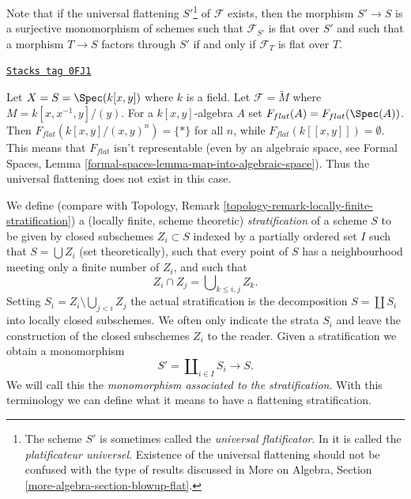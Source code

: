 Note that if the universal flattening $S'$\footnote{The scheme $S'$ is sometimes
called the {\it universal flatificator}. In \cite{GruRay} it is called
the {\it platificateur universel}. Existence of the universal flattening
should not be confused with the type of results discussed in
More on Algebra, Section \ref{more-algebra-section-blowup-flat}.} of
$\mathcal{F}$ exists, then the morphism $S' \to S$ is a surjective
monomorphism of schemes such that $\mathcal{F}_{S'}$ is flat over $S'$
and such that a morphism $T \to S$ factors through $S'$ if and only if
$\mathcal{F}_T$ is flat over $T$.

\begin{example}
\label{flat-example-no-universal-flattening}
\href{https://stacks.math.columbia.edu/tag/0FJ1}{\texttt{Stacks tag 0FJ1}}

Let $X = S = \Spec(k[x, y])$ where $k$ is a field. Let
$\mathcal{F} = \widetilde{M}$ where $M = k[x, x^{-1}, y]/(y)$.
For a $k[x, y]$-algebra $A$ set $F_{flat}(A) = F_{flat}(\Spec(A))$.
Then $F_{flat}(k[x, y]/(x, y)^n) = \{*\}$ for all $n$, while
$F_{flat}(k[[x, y]]) = \emptyset$. This means that $F_{flat}$ isn't
representable (even by an algebraic space, see
Formal Spaces, Lemma
\ref{formal-spaces-lemma-map-into-algebraic-space}).
Thus the universal flattening does not exist in this case.
\end{example}

We define (compare with
Topology, Remark \ref{topology-remark-locally-finite-stratification})
a (locally finite, scheme theoretic) {\it stratification} of a scheme $S$
to be given by closed subschemes $Z_i \subset S$ indexed by a
partially ordered set $I$ such that
$S = \bigcup Z_i$ (set theoretically), such that every point of $S$ has
a neighbourhood meeting only a finite number of $Z_i$, and such that
$$
Z_i \cap Z_j = \bigcup\nolimits_{k \leq i, j} Z_k.
$$
Setting $S_i = Z_i \setminus \bigcup_{j < i} Z_j$ the actual
stratification is the decomposition $S = \coprod S_i$ into
locally closed subschemes. We often only indicate the strata
$S_i$ and leave the construction of the closed subschemes $Z_i$
to the reader. Given a stratification we obtain a monomorphism
$$
S' = \coprod\nolimits_{i \in I} S_i \longrightarrow S.
$$
We will call this the {\it monomorphism associated to the stratification}.
With this terminology we can define what it means to have a flattening
stratification.

